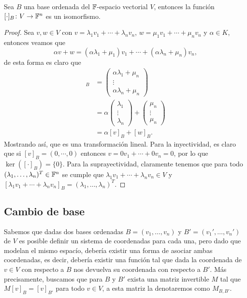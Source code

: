 \begin{prop}
  Sea $B$ una base ordenada del $\mathbb{F}$-espacio vectorial $V$, entonces la función $[\cdot]_B\colon V \to \mathbb{F}^n$ es un isomorfismo.
\end{prop}
\begin{proof}
  Sea $v,w \in V$ con $v = \lambda_1 v_1 + \cdots + \lambda_n v_n$, $w = \mu_1 v_1 + \cdots + \mu_n v_n$ y $\alpha \in K$, entonces veamos que
  \[
  \alpha v+w =  (\alpha\lambda_1+\mu_1) v_1 + \cdots + (\alpha\lambda_n+\mu_n) v_n,
  \]
  de esta forma es claro que
  \begin{align*}
    [v+w]_B 
      &= \begin{pmatrix} \alpha\lambda_1+\mu_n \\ \vdots \\ \alpha\lambda_n+\mu_n \end{pmatrix} \\
      &= \alpha\begin{pmatrix} \lambda_1 \\ \vdots \\ \lambda_n \end{pmatrix}
       + \begin{pmatrix} \mu_n \\ \vdots \\ \mu_n  \end{pmatrix} \\
      &= \alpha[v]_B + [w]_B.
  \end{align*}
  Mostrando así, que es una transformación lineal. Para la inyectividad, es claro que si $[v]_B = (0,\cdots,0)$ entonces $v = 0v_1 + \cdots + 0v_n = 0$, por lo que $\ker([\cdot]_B) = \{0\}$. Para la suprayectividad, claramente tenemos que para todo $(\lambda_1, \ldots, \lambda_n)^T \in \mathbb{F}^n$ se cumple que $\lambda_1 v_1 + \cdots + \lambda_n v_n \in V$ y  $[\lambda_1 v_1 + \cdots  + \lambda_n v_n]_B = (\lambda_1, \ldots, \lambda_n)^T$.
\end{proof}


\subsection{Cambio de base}

Sabemos que dadas dos bases ordenadas $B = (v_1,\ldots,v_n)$ y $B' = (v_1',\ldots,v_n')$ de $V$ es posible definir un sistema de coordenadas para cada una, pero dado que modelan el mismo espacío, debería existir una forma de asociar ambas coordenadas, es decir, debería existir una función tal que dada la coordenada de $v \in V$ con respecto a $B$ nos devuelva su coordenada con respecto a $B'$. Más precisamente, buscamos que para $B$ y $B'$ exista una matriz invertible $M$ tal que $M [v]_B = [v]_{B'}$ para todo $v \in V$, a esta matriz la denotaremos como $M_{B,B'}$.

